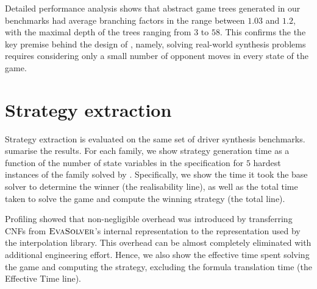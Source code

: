 {Detailed performance analysis shows that 
abstract game trees generated in our benchmarks had average 
branching factors in the range between $1.03$ and $1.2$, with 
the maximal depth of the trees ranging from $3$ to $58$.  This
confirms the the key premise behind the design of \eva, namely, 
solving real-world synthesis problems requires considering only a 
small number of opponent moves in every state of the game.}  

\section{Strategy extraction}


Strategy extraction is evaluated on the same set of driver synthesis benchmarks.   sumarise the results.  For each family, we show strategy generation time as a function of the number of state variables in the specification for $5$ hardest instances of the family solved by \eva.  Specifically, we show the time it took the base solver to determine the winner (the realisability line), as well as the total time taken to solve the game and compute the winning strategy (the total line).

Profiling showed that non-negligible overhead was introduced by
transferring CNFs from $\textsc{EvaSolver}$'s internal representation to the
representation used by the interpolation library.  This overhead
can be almost completely eliminated with additional engineering
effort.
Hence, we also show the effective time spent solving the game and
computing the strategy, excluding the formula translation time
(the Effective Time line).

